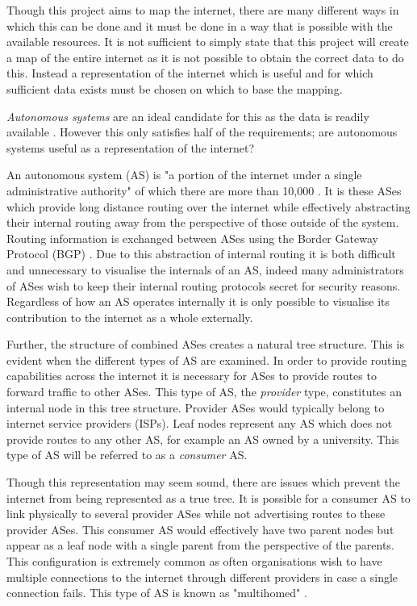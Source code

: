 Though this project aims to map the internet, there are many different ways in which this can be done and it must be done in a way that is possible with the available resources. It is not sufficient to simply state that this project will create a map of the entire internet as it is not possible to obtain the correct data to do this. Instead a representation of the internet which is useful and for which sufficient data exists must be chosen on which to base the mapping.

\textit{Autonomous systems} are an ideal candidate for this as the data is readily available \cite{introduction_ripe_api}. However this only satisfies half of the requirements; are autonomous systems useful as a representation of the internet?

An autonomous system (AS) is "a portion of the internet under a single administrative authority" of which there are more than 10,000 \cite{di_battista_computing_2003}. It is these ASes which provide long distance routing over the internet while effectively abstracting their internal routing away from the perspective of those outside of the system. Routing information is exchanged between ASes using the Border Gateway Protocol (BGP) \cite{secure_ieee}. Due to this abstraction of internal routing it is both difficult and unnecessary to visualise the internals of an AS, indeed many administrators of ASes wish to keep their internal routing protocols secret for security reasons. Regardless of how an AS operates internally it is only possible to visualise its contribution to the internet as a whole externally. 

Further, the structure of combined ASes creates a natural tree structure. This is evident when the different types of AS are examined. In order to provide routing capabilities across the internet it is necessary for ASes to provide routes to forward traffic to other ASes. This type of AS, the \textit{provider} type, constitutes an internal node in this tree structure. Provider ASes would typically belong to internet service providers (ISPs). Leaf nodes represent any AS which does not provide routes to any other AS, for example an AS owned by a university. This type of AS will be referred to as a \textit{consumer} AS.

Though this representation may seem sound, there are issues which prevent the internet from being represented as a true tree. It is possible for a consumer AS to link physically to several provider ASes while not advertising routes to these provider ASes. This consumer AS would effectively have two parent nodes but appear as a leaf node with a single parent from the perspective of the parents. This configuration is extremely common as often organisations wish to have multiple connections to the internet through different providers in case a single connection fails. This type of AS is known as "multihomed" \cite{calvert_modeling_1997}.

